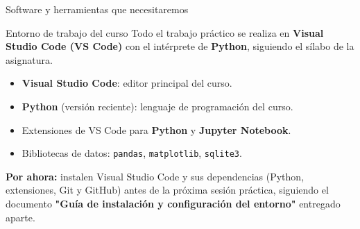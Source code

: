 \documentclass[aspectratio=169,11pt]{beamer}
\begin{document}
\begin{frame}{Software y herramientas que necesitaremos}
\small
\begin{block}{Entorno de trabajo del curso}
Todo el trabajo práctico se realiza en \textbf{Visual Studio Code (VS Code)} con el intérprete de \textbf{Python}, siguiendo el sílabo de la asignatura.
\end{block}
\vspace{0.1cm}
\begin{itemize}[itemsep=1pt]
  \item \textbf{Visual Studio Code}: editor principal del curso.
  \item \textbf{Python} (versión reciente): lenguaje de programación del curso.
  \item Extensiones de VS Code para \textbf{Python} y \textbf{Jupyter Notebook}.
  \item Bibliotecas de datos: \texttt{pandas}, \texttt{matplotlib}, \texttt{sqlite3}.
\end{itemize}
\vspace{0.1cm}
\begin{warnbox}[top=2pt,bottom=2pt]
\footnotesize\textbf{Por ahora:} instalen Visual Studio Code y sus dependencias (Python, extensiones, Git y GitHub) antes de la próxima sesión práctica, siguiendo el documento \textbf{"Guía de instalación y configuración del entorno"} entregado aparte.
\end{warnbox}
\end{frame}
\end{document}
